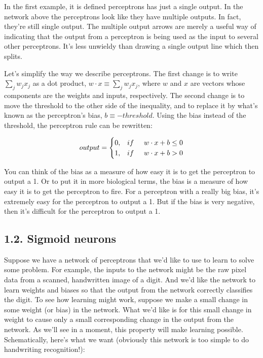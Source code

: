 \documentclass[12 pt]{article}
\begin{document}
In the first example, it is defined perceptrons has just a single
output. In the network above the perceptrons look like they have
multiple outputs. In fact, they're still single output. The multiple
output arrows are merely a useful way of indicating that the output from
a perceptron is being used as the input to several other perceptrons.
It's less unwieldy than drawing a single output line which then splits.

Let's simplify the way we describe perceptrons. The first change is to
write $ \sum_j w_j x_j $ as a dot product, $ w \cdot x
\equiv \sum_j w_j x_j $, where $ w $ and $ x $ are vectors whose components are
the weights and inputs, respectively.
The second change is to move the threshold to the other side of the inequality,
and to replace it by what's known as the perceptron's bias,
$ b \equiv -threshold. $ Using the bias instead of the threshold, the
perceptron rule can be rewritten:

\begin{equation}
    output =
    \begin{cases}
        0,& if \hspace{0.5 cm} w \cdot x + b \leq 0 \\
        1,& if \hspace{0.5 cm} w \cdot x + b > 0
    \end{cases}
\end{equation}

You can think of the bias as a measure of how easy it is to get the
perceptron to output a 1. Or to put it in more biological terms, the
bias is a measure of how easy it is to get the perceptron to fire. For a
perceptron with a really big bias, it's extremely easy for the
perceptron to output a 1. But if the bias is very negative, then it's
difficult for the perceptron to output a 1.

\subsection{1.2. Sigmoid neurons}
\label{sigmoid-neurons}

Suppose we have a network of perceptrons that we'd like to use to learn
to solve some problem. For example, the inputs to the network might be
the raw pixel data from a scanned, handwritten image of a digit. And
we'd like the network to learn weights and biases so that the output
from the network correctly classifies the digit. To see how learning
might work, suppose we make a small change in some weight (or bias) in
the network. What we'd like is for this small change in weight to cause
only a small corresponding change in the output from the network. As
we'll see in a moment, this property will make learning possible.
Schematically, here's what we want (obviously this network is too simple
to do handwriting recognition!):
\end{document}
